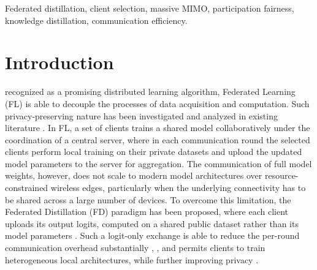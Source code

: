 \documentclass[journal]{IEEEtran}
\newcommand{\rev}[1]{\textcolor{blue}{#1}}
\begin{document}
\begin{IEEEkeywords}
Federated distillation, client selection, massive MIMO, participation fairness, knowledge distillation, communication efficiency.
\end{IEEEkeywords}

{\renewcommand{\abstractname}{Impact Statement}
\begin{abstract}
FD lets edge devices collaborate on a shared machine-learning model by exchanging only low-dimensional output logits, rather than raw data or model weights, over the wireless link. In real deployments only a small subset of devices is served per round, and selecting that subset uniformly at random leaves some clients under-utilized while others are picked four to fifteen times more often. The algorithm proposed in this paper rotates clients by a participation debt while preferring those whose data covers under-represented classes, guaranteeing equitable selection over short windows of rounds. \rev{On standard benchmarks it lowers the participation imbalance by roughly an order of magnitude while matching the accuracy of the random baseline, and the fairness benefit persists across data heterogeneity levels, downlink channel quality, and client-pool sizes up to two hundred devices.} The algorithm is directly applicable to healthcare-wearable, vehicular-sensing, and Internet-of-Things deployments where equitable device participation and constrained communication budgets are operational requirements.
\end{abstract}}
\vspace{-1em}
\section{Introduction}
\label{sec:introduction}
 recognized as a promising distributed learning algorithm, Federated Learning (FL) \cite{borazjani2026redefining} is able to decouple the processes of data acquisition and computation. Such privacy-preserving nature has been investigated and analyzed in existing literature \cite{tamboli2026p, lim2020federated, huang2024survey,lu2024noniid}. In FL, a set of clients trains a shared model collaboratively under the coordination of a central server, where in each communication round the selected clients perform local training on their private datasets and upload the updated model parameters to the server for aggregation. The communication of full model weights, however, does not scale to modern model architectures over resource-constrained wireless edges, particularly when the underlying connectivity has to be shared across a large number of devices. To overcome this limitation, the Federated Distillation (FD) paradigm \cite{xing2022efficient} has been proposed, where each client uploads its output logits, computed on a shared public dataset rather than its model parameters \cite{itahara2023distillation}. Such a logit-only exchange is able to reduce the per-round communication overhead substantially \cite{sattler2022cfd}, \cite{sattler2023fedaux}, and permits clients to train heterogeneous local architectures, while further improving privacy \cite{chan2021fedhe, cho2023clustered, wu2024fedict}.
\end{document}
